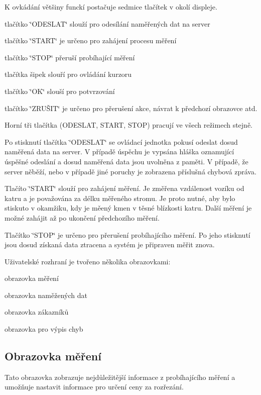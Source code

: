 K ovkádání většiny funckí postačuje sedmice tlačítek v okolí displeje.
\begin{DoxyItemize}
\item tlačítko \char`\"{}ODESLAT\char`\"{} slouží pro odesílání naměřených dat na server
\item tlačítko \char`\"{}START\char`\"{} je určeno pro zahájení procesu měření
\item tlačítko \char`\"{}STOP\char`\"{} přeruší probíhající měření
\item tlačítka šipek slouří pro ovládání kurzoru
\item tlačítko \char`\"{}OK\char`\"{} slouší pro potvrzování
\item tlačítko \char`\"{}ZRUŠIT\char`\"{} je určeno pro přerušení akce, návrat k předchozí obrazovce atd.
\end{DoxyItemize}

Horní tři tlačítka (ODESLAT, START, STOP) pracují ve všech režimech stejně.

Po stisknutí tlačítka \char`\"{}ODESLAT\char`\"{} se ovládací jednotka pokusí odeslat dosud naměřená data na server. V případě úspěchu je vypsána hláška oznamující úspěšné odeslání a dosud naměřená data jsou uvolněna z paměti. V případě, že server něběží, nebo v případě jiné poruchy je zobrazena příslušná chybová zpráva.

Tlačíto \char`\"{}START\char`\"{} slouží pro zahájení měření. Je změřena vzdálenost vozíku od katru a je považována za délku měřeného stromu. Je proto nutné, aby bylo stiskuto v okamžiku, kdy je měený kmen v těsné blízkosti katru. Další měření je možné zahájit až po ukončení předchozího měření.

Tlačítko \char`\"{}STOP\char`\"{} je určeno pro přerušení probíhajícího měření. Po jeho stisknutí jsou dosud získaná data ztracena a systém je připraven měřit znova.

Uživatelské rozhraní je tvořeno několika obrazovkami:
\begin{DoxyItemize}
\item obrazovka měření
\item obrazovka naměžených dat
\item obrazovka zákazníků
\item obrazovka pro výpis chyb
\end{DoxyItemize}\subsection{Obrazovka měření}\label{Manual_obrazovka_mereni}
Tato obrazovka zobrazuje nejdůležitější informace z probíhajícího měření a umožňuje nastavit informace pro určení ceny za rozřezání.

